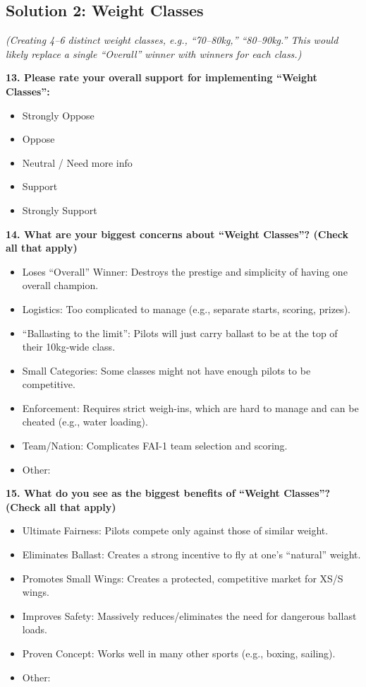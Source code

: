 \documentclass[11pt,a4paper]{article}
\begin{document}
\subsection{Solution 2: Weight Classes}

\textit{(Creating 4--6 distinct weight classes, e.g., ``70--80kg,'' ``80--90kg.'' This would likely replace a single ``Overall'' winner with winners for each class.)}

\textbf{13. Please rate your overall support for implementing ``Weight Classes'':}
\begin{itemize}[label=$\square$]
    \item Strongly Oppose
    \item Oppose
    \item Neutral / Need more info
    \item Support
    \item Strongly Support
\end{itemize}

\textbf{14. What are your biggest concerns about ``Weight Classes''? (Check all that apply)}
\begin{itemize}[label=$\square$]
    \item Loses ``Overall'' Winner: Destroys the prestige and simplicity of having one overall champion.
    \item Logistics: Too complicated to manage (e.g., separate starts, scoring, prizes).
    \item ``Ballasting to the limit'': Pilots will just carry ballast to be at the top of their 10kg-wide class.
    \item Small Categories: Some classes might not have enough pilots to be competitive.
    \item Enforcement: Requires strict weigh-ins, which are hard to manage and can be cheated (e.g., water loading).
    \item Team/Nation: Complicates FAI-1 team selection and scoring.
    \item Other: \underline{\hspace{3cm}}
\end{itemize}

\textbf{15. What do you see as the biggest benefits of ``Weight Classes''? (Check all that apply)}
\begin{itemize}[label=$\square$]
    \item Ultimate Fairness: Pilots compete only against those of similar weight.
    \item Eliminates Ballast: Creates a strong incentive to fly at one's ``natural'' weight.
    \item Promotes Small Wings: Creates a protected, competitive market for XS/S wings.
    \item Improves Safety: Massively reduces/eliminates the need for dangerous ballast loads.
    \item Proven Concept: Works well in many other sports (e.g., boxing, sailing).
    \item Other: \underline{\hspace{3cm}}
\end{itemize}
\end{document}
